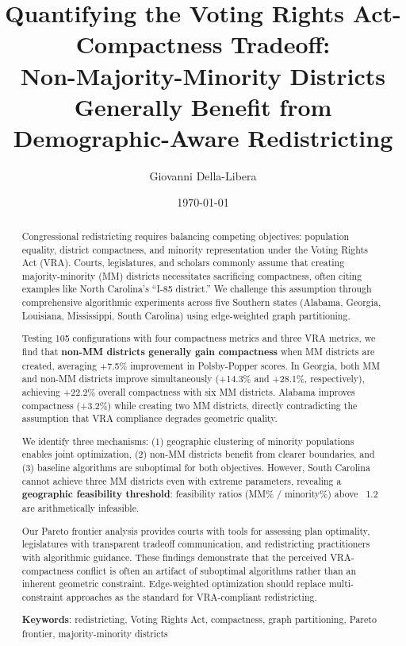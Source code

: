 \documentclass[12pt,letterpaper]{article}
\title{\textbf{Quantifying the Voting Rights Act-Compactness Tradeoff:\\
Non-Majority-Minority Districts Generally Benefit from\\
Demographic-Aware Redistricting}}
\author{
    Giovanni Della-Libera
}
\date{\today}
\begin{document}
\maketitle

\begin{abstract}
Congressional redistricting requires balancing competing objectives: population equality, district compactness, and minority representation under the Voting Rights Act (VRA). Courts, legislatures, and scholars commonly assume that creating majority-minority (MM) districts necessitates sacrificing compactness, often citing examples like North Carolina's ``I-85 district.'' We challenge this assumption through comprehensive algorithmic experiments across five Southern states (Alabama, Georgia, Louisiana, Mississippi, South Carolina) using edge-weighted graph partitioning.

Testing 105 configurations with four compactness metrics and three VRA metrics, we find that \textbf{non-MM districts generally gain compactness} when MM districts are created, averaging +7.5\% improvement in Polsby-Popper scores. In Georgia, both MM and non-MM districts improve simultaneously (+14.3\% and +28.1\%, respectively), achieving +22.2\% overall compactness with six MM districts. Alabama improves compactness (+3.2\%) while creating two MM districts, directly contradicting the assumption that VRA compliance degrades geometric quality.

We identify three mechanisms: (1) geographic clustering of minority populations enables joint optimization, (2) non-MM districts benefit from clearer boundaries, and (3) baseline algorithms are suboptimal for both objectives. However, South Carolina cannot achieve three MM districts even with extreme parameters, revealing a \textbf{geographic feasibility threshold}: feasibility ratios (MM\% / minority\%) above ~1.2 are arithmetically infeasible.

Our Pareto frontier analysis provides courts with tools for assessing plan optimality, legislatures with transparent tradeoff communication, and redistricting practitioners with algorithmic guidance. These findings demonstrate that the perceived VRA-compactness conflict is often an artifact of suboptimal algorithms rather than an inherent geometric constraint. Edge-weighted optimization should replace multi-constraint approaches as the standard for VRA-compliant redistricting.

\textbf{Keywords}: redistricting, Voting Rights Act, compactness, graph partitioning, Pareto frontier, majority-minority districts
\end{abstract}
\end{document}

